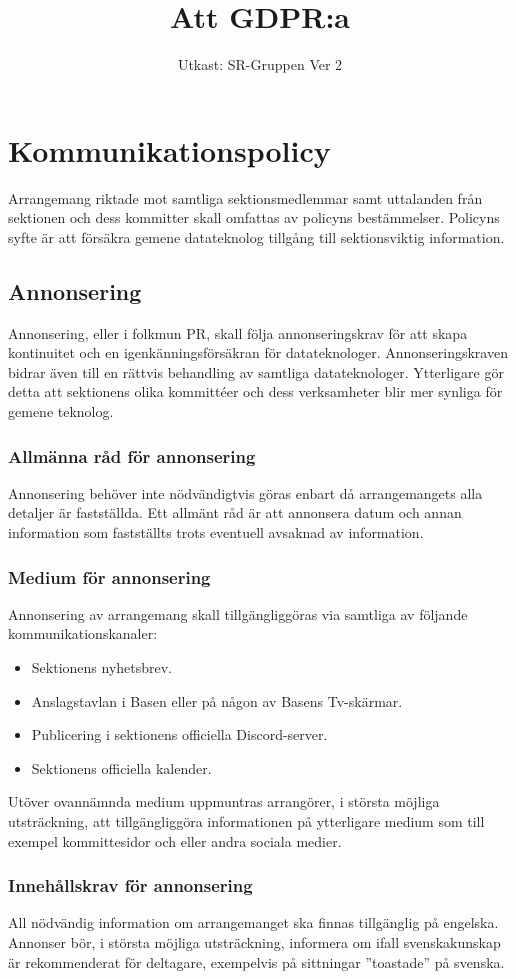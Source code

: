 \documentclass[a4paper]{dtek}
\title{Att GDPR:a}
\date{Utkast: SR-Gruppen Ver 2}
\begin{document}
\section{Kommunikationspolicy}
Arrangemang riktade mot samtliga sektionsmedlemmar samt uttalanden från sektionen och dess kommitter skall omfattas av policyns bestämmelser. Policyns syfte är att försäkra gemene datateknolog tillgång till sektionsviktig information.

\subsection{Annonsering}
Annonsering, eller i folkmun PR, skall följa annonseringskrav för att skapa kontinuitet
och en igenkänningsförsäkran för datateknologer. Annonseringskraven bidrar även till en
rättvis behandling av samtliga datateknologer. Ytterligare gör detta att sektionens olika
kommittéer och dess verksamheter blir mer synliga för gemene teknolog.

\subsubsection{Allmänna råd för annonsering}
Annonsering behöver inte nödvändigtvis göras enbart då arrangemangets alla detaljer är
fastställda. Ett allmänt råd är att annonsera datum och annan information som fastställts
trots eventuell avsaknad av information.

\subsubsection{Medium för annonsering}
Annonsering av arrangemang skall tillgängliggöras via samtliga av följande kommunikationskanaler:
\begin{itemize}
    \item Sektionens nyhetsbrev.
    \item Anslagstavlan i Basen eller på någon av Basens Tv-skärmar.
    \item Publicering i sektionens officiella Discord-server.
    \item Sektionens officiella kalender.
\end{itemize}
Utöver ovannämnda medium uppmuntras arrangörer, i största möjliga utsträckning, att
tillgängliggöra informationen på ytterligare medium som till exempel kommittesidor och
 eller andra sociala medier.

\subsubsection{Innehållskrav för annonsering}
All nödvändig information om arrangemanget ska finnas tillgänglig på engelska. Annonser
bör, i största möjliga utsträckning, informera om ifall svenskakunskap är rekommenderat
för deltagare, exempelvis på sittningar ”toastade” på svenska.
\end{document}
